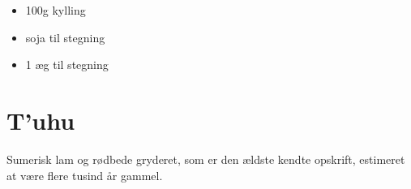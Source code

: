 \documentclass{book}
\begin{document}
{\begin{minipage}[t]{0.5\textwidth}
\begin{itemize}
     \begin{enumerate}
        \item evt. Flere grøntsager hvis ønskede
        \item evt. Pandestegt spidskål (eventuelt stegt i goyang(koreansk chille pasta))
    \end{enumerate}
    \item 100g kylling
    \item soja til stegning
    \item 1 æg til stegning
\end{itemize}
\end{minipage}
\begin{minipage}[t]{0.5\textwidth}
\end{minipage}

\newpage \section{T'uhu}
Sumerisk lam og rødbede gryderet, som er den ældste kendte opskrift, estimeret at være flere tusind år gammel.

}
\end{document}
